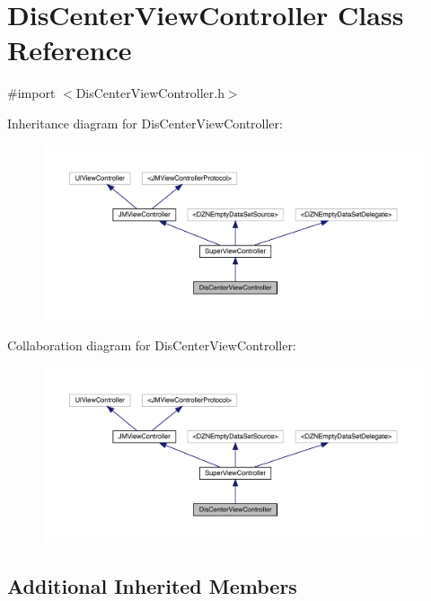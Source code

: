 \hypertarget{interface_dis_center_view_controller}{}\section{Dis\+Center\+View\+Controller Class Reference}
\label{interface_dis_center_view_controller}


{\ttfamily \#import $<$Dis\+Center\+View\+Controller.\+h$>$}



Inheritance diagram for Dis\+Center\+View\+Controller\+:\nopagebreak
\begin{figure}[H]
\begin{center}
\leavevmode
\includegraphics[width=350pt]{interface_dis_center_view_controller__inherit__graph}
\end{center}
\end{figure}


Collaboration diagram for Dis\+Center\+View\+Controller\+:\nopagebreak
\begin{figure}[H]
\begin{center}
\leavevmode
\includegraphics[width=350pt]{interface_dis_center_view_controller__coll__graph}
\end{center}
\end{figure}
\subsection*{Additional Inherited Members}


